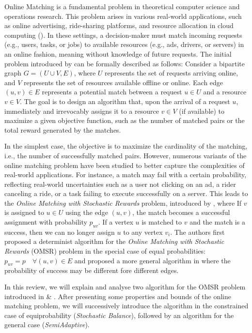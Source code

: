 \documentclass[12pt, twocolumn]{article}
\begin{document}
\par
\hspace{\parindent}Online Matching is a fundamental problem in theoretical computer science and operations research. This problem arises in various real-world applications, such as online advertising, ride-sharing platforms, and resource allocation in cloud computing (\cite{survey2024}). In these settings, a decision-maker must match incoming requests (e.g., users, tasks, or jobs) to available resources (e.g., ads, drivers, or servers) in an online fashion, meaning without knowledge of future requests. The initial problem introduced by \cite{karp1990}  can be formally described as follows: Consider a bipartite graph \( G = (U \cup V, E) \), where \( U \) represents the set of requests arriving online, and \( V \) represents the set of resources available offline or online. Each edge \( (u, v) \in E \) represents a potential match between a request \( u \in U \) and a resource \( v \in V \). The goal is to design an algorithm that, upon the arrival of a request \( u \), immediately and irrevocably assigns it to a resource \( v \in V \) (if available) to maximize a given objective function, such as the number of matched pairs or the total reward generated by the matches.
\par
\hspace{\parindent}In the simplest case, the objective is to maximize the cardinality of the matching, i.e., the number of successfully matched pairs. However, numerous variants of the online matching problem have been studied to better capture the complexities of real-world applications. For instance, a match may fail with a certain probability, reflecting real-world uncertainties such as a user not clicking on an ad, a rider canceling a ride, or a task failing to execute successfully on a server. This leads to the \textit{Online Matching with Stochastic Rewards} problem, introduced by \cite{mehta2012}, where If $v$ is assigned to $u \in U$ using the edge $(u,v)$, the match becomes a successful assignment with probability $p_{uv}$. If a vertex $u$ is matched to $v$ and the match is a success, then we can no longer assign $u$ to any vertex $v_i$. The authors first proposed a determinist algorithm for the \textit{Online Matching with Stochastic Rewards} (OMSR) problem in the special case of equal probabilities: $p_{uv} = p \quad  \forall (u, v) \in E$ and proposed a more general algorithm in \cite{mehta2015} where the probability of success may be different fore different edges.
\par
\hspace{\parindent}In this review, we will explain and analyse two algorithm for the OMSR problem introduced in \cite{mehta2012} \& \cite{mehta2015}. After presenting some properties and bounds of the online matching problem, we will successively introduce the algorithm in the constrained case of equiprobability (\textit{Stochastic Balance}), followed by an algorithm for the general case (\textit{SemiAdaptive}).
\end{document}
